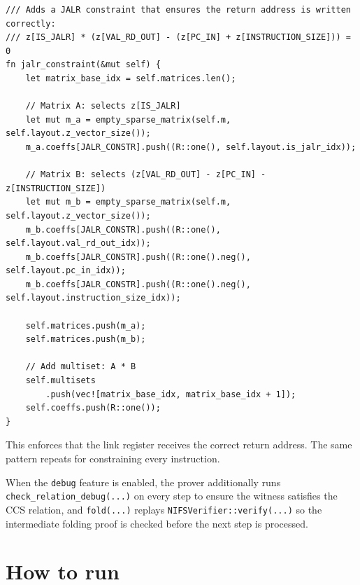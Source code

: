 \begin{verbatim}
/// Adds a JALR constraint that ensures the return address is written correctly:
/// z[IS_JALR] * (z[VAL_RD_OUT] - (z[PC_IN] + z[INSTRUCTION_SIZE])) = 0
fn jalr_constraint(&mut self) {
    let matrix_base_idx = self.matrices.len();

    // Matrix A: selects z[IS_JALR]
    let mut m_a = empty_sparse_matrix(self.m, self.layout.z_vector_size());
    m_a.coeffs[JALR_CONSTR].push((R::one(), self.layout.is_jalr_idx));

    // Matrix B: selects (z[VAL_RD_OUT] - z[PC_IN] - z[INSTRUCTION_SIZE])
    let mut m_b = empty_sparse_matrix(self.m, self.layout.z_vector_size());
    m_b.coeffs[JALR_CONSTR].push((R::one(), self.layout.val_rd_out_idx));
    m_b.coeffs[JALR_CONSTR].push((R::one().neg(), self.layout.pc_in_idx));
    m_b.coeffs[JALR_CONSTR].push((R::one().neg(), self.layout.instruction_size_idx));

    self.matrices.push(m_a);
    self.matrices.push(m_b);

    // Add multiset: A * B
    self.multisets
        .push(vec![matrix_base_idx, matrix_base_idx + 1]);
    self.coeffs.push(R::one());
}
\end{verbatim}

This enforces that the link register receives the correct return address. The same pattern repeats for constraining every instruction.

When the \texttt{debug} feature is enabled, the prover additionally runs \texttt{check\_relation\_debug(...)} on every step to ensure the witness satisfies the CCS relation, and \texttt{fold(...)} replays \texttt{NIFSVerifier::verify(...)} so the intermediate folding proof is checked before the next step is processed.

\section{How to run}

